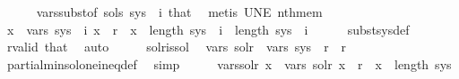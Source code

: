 \begin{isabellebody}
\ \ \ \ \isamarkupfalse%
\ vars{\isacharunderscore}{\kern0pt}subst{\isacharbrackleft}{\kern0pt}of\ sols\ {\isachardoublequoteopen}sys\ {\isacharbang}{\kern0pt}\ i{\isachardoublequoteclose}{\isacharbrackright}{\kern0pt}\ that\ \isamarkupfalse%
\ {\isacharparenleft}{\kern0pt}metis\ UN{\isacharunderscore}{\kern0pt}E\ nth{\isacharunderscore}{\kern0pt}mem{\isacharparenright}{\kern0pt}\isanewline
\ \ \isamarkupfalse%
\ \isamarkupfalse%
\ {\isachardoublequoteopen}{\isasymforall}x\ {\isasymin}\ vars\ {\isacharparenleft}{\kern0pt}sys{\isacharprime}{\kern0pt}\ {\isacharbang}{\kern0pt}\ i{\isacharparenright}{\kern0pt}{\isachardot}{\kern0pt}\ x\ {\isasymge}\ r\ {\isasymand}\ x\ {\isacharless}{\kern0pt}\ length\ sys{\isachardoublequoteclose}\ \ {\isachardoublequoteopen}i\ {\isacharless}{\kern0pt}\ length\ sys{\isachardoublequoteclose}\ \ i\isanewline
\ \ \ \ \isamarkupfalse%
\ subst{\isacharunderscore}{\kern0pt}sys{\isacharunderscore}{\kern0pt}def\ \isamarkupfalse%
\ r{\isacharunderscore}{\kern0pt}valid\ that\ \isamarkupfalse%
\ auto\isanewline
\ \ \isamarkupfalse%
\ \isamarkupfalse%
\ sol{\isacharunderscore}{\kern0pt}r{\isacharunderscore}{\kern0pt}is{\isacharunderscore}{\kern0pt}sol\ \isamarkupfalse%
\ {\isachardoublequoteopen}vars\ {\isacharparenleft}{\kern0pt}sol{\isacharunderscore}{\kern0pt}r{\isacharparenright}{\kern0pt}\ {\isasymsubseteq}\ vars\ {\isacharparenleft}{\kern0pt}sys{\isacharprime}{\kern0pt}\ {\isacharbang}{\kern0pt}\ r{\isacharparenright}{\kern0pt}\ {\isacharminus}{\kern0pt}\ {\isacharbraceleft}{\kern0pt}r{\isacharbraceright}{\kern0pt}{\isachardoublequoteclose}\isanewline
\ \ \ \ \isamarkupfalse%
\ partial{\isacharunderscore}{\kern0pt}min{\isacharunderscore}{\kern0pt}sol{\isacharunderscore}{\kern0pt}one{\isacharunderscore}{\kern0pt}ineq{\isacharunderscore}{\kern0pt}def\ \isamarkupfalse%
\ simp\isanewline
\ \ \isamarkupfalse%
\ \isamarkupfalse%
\ vars{\isacharunderscore}{\kern0pt}sol{\isacharunderscore}{\kern0pt}r{\isacharcolon}{\kern0pt}\ {\isachardoublequoteopen}{\isasymforall}x\ {\isasymin}\ vars\ sol{\isacharunderscore}{\kern0pt}r{\isachardot}{\kern0pt}\ x\ {\isachargreater}{\kern0pt}\ r\ {\isasymand}\ x\ {\isacharless}{\kern0pt}\ length\ sys{\isachardoublequoteclose}\isanewline
\ \ \ \ \isamarkupfalse%

\end{isabellebody}
